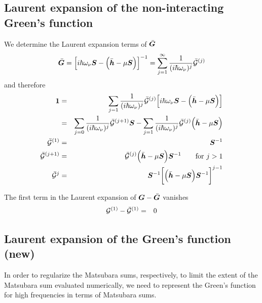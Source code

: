 \documentclass[11pt,a4paper]{report}
\begin{document}
\subsection{Laurent expansion of the non-interacting Green's function}
We determine the Laurent expansion terms of $\bar{\bm{G}}$
\begin{eqnarray}
\bar{\bm{G}}=\Bigl[i\hbar\omega_\nu\bm{S}-\Bigl(\bar{\bm{h}}-\mu\bm{S}\Bigr)
\Bigr]^{-1}
=\sum_{j=1}^\infty\frac{1}{(i\hbar\omega_\nu)^j}
\bar{\mathcal{\bm{G}}}^{(j)}
\end{eqnarray}
and therefore
\begin{eqnarray}
\bm{1}
&=&
\sum_{j=1}\frac{1}{(i\hbar\omega_\nu)^j}\bar{\mathcal{\bm{G}}}^{(j)}
\Bigl[i\hbar\omega_\nu\bm{S}-\Bigl(\bar{\bm{h}}-\mu\bm{S}\Bigr)
\Bigr]
\nonumber\\
&=&
\sum_{j=0}\frac{1}{(i\hbar\omega_\nu)^{j}}\bar{\mathcal{\bm{G}}}^{(j+1)}\bm{S}
-\sum_{j=1}\frac{1}{(i\hbar\omega_\nu)^j}\bar{\mathcal{\bm{G}}}^{(j)}\Bigl(\bar{\bm{h}}-\mu\bm{S}\Bigr)
\nonumber\\
\bar{\mathcal{\bm{G}}}^{(1)}
&=&\bm{S}^{-1}
\nonumber\\
\bar{\mathcal{\bm{G}}}^{(j+1)}
&=&\bar{\mathcal{\bm{G}}}^{(j)}\Bigl(\bar{\bm{h}}-\mu\bm{S}\Bigr)\bm{S}^{-1}
\qquad\text{for $j>1$}
\nonumber\\
\bar{\mathcal{\bm{G}}}^{j}&=&
\bm{S}^{-1}\biggl[\Bigl(\bar{\bm{h}}-\mu\bm{S}\Bigr)\bm{S}^{-1}\biggr]^{j-1}
\label{eq:laurentexpansionofgbar}
\end{eqnarray}

The first term in the Laurent expansion of $\bm{G}-\bar{\bm{G}}$ vanishes
\begin{eqnarray}
\mathcal{\bm{G}}^{(1)}-\bar{\mathcal{\bm{G}}}^{(1)}&=&0
\end{eqnarray}

\subsection{Laurent expansion of the Green's function (new)}
\label{sec:laurentgreen}
In order to regularize the Matsubara sums, respectively, to limit the
extent of the Matsubara sum evaluated numerically, we need to
represent the Green's function for high frequencies in terms of
Matsubara sums.
\end{document}
